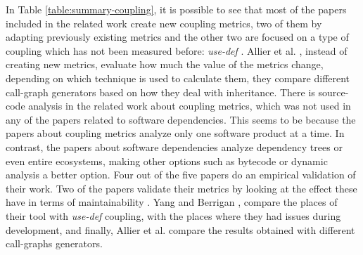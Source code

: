 In Table \ref{table:summary-coupling}, it is possible to see that most of the papers included in the related work create new coupling metrics, two of them by adapting previously existing metrics \cite{Vernazza2000, Almugrin2016} and the other two are focused on a type of coupling which has not been measured before: \textit{use-def} \cite{yang2005detecting, Yang2010}. Allier et al. \cite{Allier2010}, instead of creating new metrics, evaluate how much the value of the metrics change, depending on which technique is used to calculate them, they compare different call-graph generators based on how they deal with inheritance. There is source-code analysis in the related work about coupling metrics, which was not used in any of the papers related to software dependencies. This seems to be because the papers about coupling metrics analyze only one software product at a time. In contrast, the papers about software dependencies analyze dependency trees or even entire ecosystems, making other options such as bytecode or dynamic analysis a better option. Four out of the five papers do an empirical validation of their work. Two of the papers validate their metrics by looking at the effect these have in terms of maintainability \cite{Yang2010, Almugrin2016}. Yang and Berrigan \cite{yang2005detecting}, compare the places of their tool with \textit{use-def} coupling, with the places where they had issues during development, and finally, Allier et al. \cite{Allier2010} compare the results obtained with different call-graphs generators.
